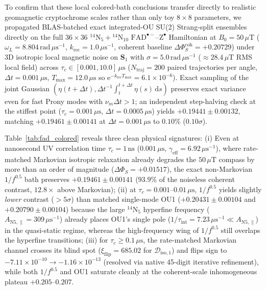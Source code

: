\documentclass[twocolumn,10pt,amsmath,amssymb,floatfix]{revtex4-2}
\theoremstyle{plain}
\theoremstyle{definition}
\newcommand{\dd}{\mathrm{d}}
\newcommand{\ee}{\mathrm{e}}
\newcommand{\DeltaPhi}{\Delta\Phi_S}
\newcommand{\xiflip}{\xi_{\mathrm{flip}}}
\begin{document}
To confirm that these local colored-bath conclusions transfer directly to realistic geomagnetic cryptochrome scales rather than only toy $8\times 8$ parameters, we propagated BLAS-batched exact integrated-OU SU(2) Strang-split ensembles directly on the full $36\times 36$ $^{14}\text{N}_5 + {}^{14}\text{N}_{10}$ $\mathrm{FAD}^{\bullet-}\text{--}\mathrm{Z}^{\bullet}$ Hamiltonian at $B_0 = 50\,\mu\text{T}$ ($\omega_L = 8.804\,\text{rad}\,\mu\text{s}^{-1}$, $k_{\mathrm{rec}} = 1.0\,\mu\text{s}^{-1}$, coherent baseline $\DeltaPhi^{\mathrm{coh}} = +0.20729$) under 3D isotropic local magnetic noise on $\mathbf{S}_1$ with $\sigma = 5.0\,\text{rad}\,\mu\text{s}^{-1}$ ($\approx 28.4\,\mu\text{T}$ RMS local field) across $\tau_c \in [0.001, 10.0]\,\mu\text{s}$ ($N_{\mathrm{traj}} = 200$ paired trajectories per angle, $\Delta t = 0.001\,\mu\text{s}$, $T_{\max} = 12.0\,\mu\text{s}$ so $\ee^{-k_{\mathrm{rec}}T_{\max}} = 6.1\times 10^{-6}$). Exact sampling of the joint Gaussian $(\eta(t+\Delta t), \Delta t^{-1}\!\int_t^{t+\Delta t}\eta(s)\,\dd s)$ preserves exact variance even for fast Prony modes with $\nu_m \Delta t > 1$; an independent step-halving check at the stiffest point ($\tau_c = 0.001\,\mu\text{s}$, $\Delta t = 0.0005\,\mu\text{s}$) yields $+0.19441 \pm 0.00132$, matching $+0.19461 \pm 0.00141$ at $\Delta t = 0.001\,\mu\text{s}$ to $0.10\%$ ($0.10\sigma$).

Table~\ref{tab:fad_colored} reveals three clean physical signatures:
(i) Even at nanosecond UV correlation time $\tau_c = 1\,\text{ns}$ ($0.001\,\mu\text{s}$, $\gamma_{\mathrm{eff}} = 6.92\,\mu\text{s}^{-1}$), where rate-matched Markovian isotropic relaxation already degrades the $50\,\mu\text{T}$ compass by more than an order of magnitude ($\DeltaPhi = +0.01517$), the exact non-Markovian $1/f^{0.5}$ bath preserves $+0.19461 \pm 0.00141$ ($93.9\%$ of the noiseless coherent contrast, $12.8\times$ above Markovian);
(ii) at $\tau_c = 0.001\text{--}0.01\,\mu\text{s}$, $1/f^{0.5}$ yields slightly \emph{lower} contrast ($> 5\sigma$) than matched single-mode OU1 ($+0.20431 \pm 0.00104$ and $+0.20790 \pm 0.00104$) because the large $^{14}\text{N}_5$ hyperfine frequency ($A_{\mathrm{N5},\parallel} = 309\,\mu\text{s}^{-1}$) already places OU1's single pole ($1/\tau_{\mathrm{int}} = 7.23\,\mu\text{s}^{-1} \ll A_{\mathrm{N5},\parallel}$) in the quasi-static regime, whereas the high-frequency wing of $1/f^{0.5}$ still overlaps the hyperfine transitions;
(iii) for $\tau_c \ge 0.1\,\mu\text{s}$, the rate-matched Markovian channel crosses its blind spot ($\xiflip = 685.02$ for $\mathcal{D}_{\mathrm{iso},1}$) and flips sign to $-7.11\times 10^{-10} \to -1.16\times 10^{-13}$ (resolved via native 45-digit iterative refinement), while both $1/f^{0.5}$ and OU1 saturate cleanly at the coherent-scale inhomogeneous plateau $+0.205\text{--}0.207$.
\end{document}
